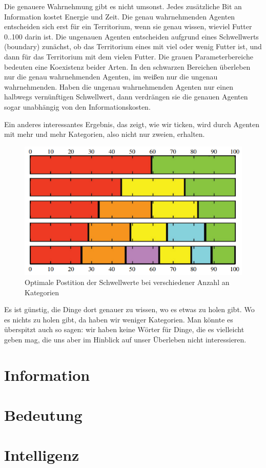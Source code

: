 \documentclass[12pt]{book}
\begin{document}
Die genauere Wahrnehmung gibt es nicht umsonst. Jedes zusätzliche Bit an Information kostet Energie und Zeit. Die genau wahrnehmenden Agenten entscheiden sich erst für ein Territorium, wenn sie genau wissen, wieviel Futter 0..100 darin ist. Die ungenauen Agenten entscheiden aufgrund eines Schwellwerts (boundary) zunächst, ob das Territorium eines mit viel oder wenig Futter ist, und dann für das Territorium mit dem vielen Futter. Die grauen Parameterbereiche bedeuten eine Koexistenz beider Arten. In den schwarzen Bereichen überleben nur die genau wahrnehmenden Agenten, im weißen nur die ungenau wahrnehmenden. Haben die ungenau wahrnehmenden Agenten nur einen halbwegs vernünftigen Schwellwert, dann verdrängen sie die genauen Agenten sogar unabhängig von den Informationskosten.

Ein anderes interessantes Ergebnis, das zeigt, wie wir ticken, wird durch Agenten mit mehr und mehr Kategorien, also nicht nur zweien, erhalten. 
\begin{figure}[!h]\begin{center}
  \includegraphics[width=13cm]{Bilder/nCat_Agenten.png}
  \caption{Optimale Postition der Schwellwerte bei verschiedener Anzahl an Kategorien}
  \label{fig:srgame}
\end{center}\end{figure}
Es ist günstig, die Dinge dort genauer zu wissen, wo es etwas zu holen gibt. Wo es nichts zu holen gibt, da haben wir weniger Kategorien. Man könnte es überspitzt auch so sagen: wir haben keine Wörter für Dinge, die es vielleicht geben mag, die uns aber im Hinblick auf unser Überleben nicht interessieren.

\section{Information}
\section{Bedeutung}
\section{Intelligenz}
\end{document}

